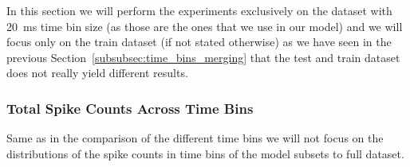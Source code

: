 In this section we will perform the experiments exclusively on the dataset with 20~ms time bin size (as those are the ones that we use in our model) and we will focus only on the train dataset (if not stated otherwise) as we have seen  in the previous Section~\ref{subsubsec:time_bins_merging} that the test and train dataset does not really yield different results. 

\subsubsection{Total Spike Counts Across Time Bins}
\label{subsubsec:total_spike_counts_subset}
Same as in the comparison of the different time bins we will not focus on the distributions of the spike counts in time bins of the model subsets to full dataset.